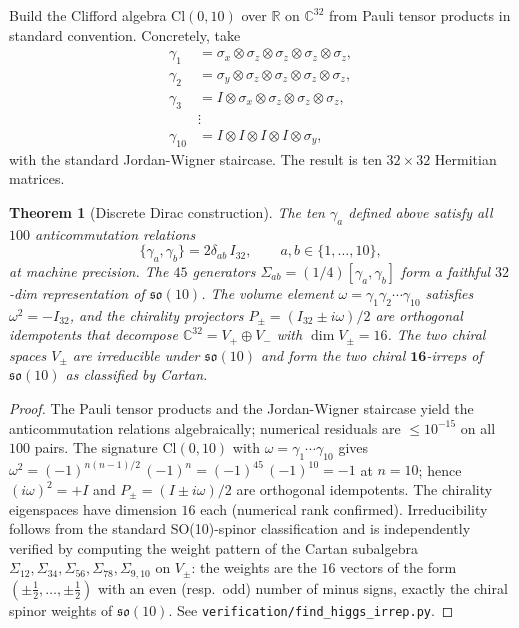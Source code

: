 \documentclass[11pt,reqno]{amsart}
\newtheorem{theorem}{Theorem}[section]
\theoremstyle{definition}
\newcommand{\C}{\mathbb{C}}
\newcommand{\R}{\mathbb{R}}
\newcommand{\so}{\mathfrak{so}}
\newcommand{\Cl}{\mathrm{Cl}}
\begin{document}
Build the Clifford algebra $\Cl(0, 10)$ over $\R$ on $\C^{32}$ from
Pauli tensor products in standard convention. Concretely, take
\begin{align*}
  \gamma_1 &= \sigma_x \otimes \sigma_z \otimes \sigma_z \otimes
              \sigma_z \otimes \sigma_z, \\
  \gamma_2 &= \sigma_y \otimes \sigma_z \otimes \sigma_z \otimes
              \sigma_z \otimes \sigma_z, \\
  \gamma_3 &= I \otimes \sigma_x \otimes \sigma_z \otimes \sigma_z
              \otimes \sigma_z, \\
  &\vdots \\
  \gamma_{10} &= I \otimes I \otimes I \otimes I \otimes \sigma_y,
\end{align*}
with the standard Jordan-Wigner staircase. The result is ten
$32 \times 32$ Hermitian matrices.

\begin{theorem}[Discrete Dirac construction]
\label{thm:cl-construction}
The ten $\gamma_a$ defined above satisfy all $100$ anticommutation
relations
\[
  \{\gamma_a, \gamma_b\} = 2 \delta_{ab}\, I_{32}, \qquad a, b \in
  \{1, \ldots, 10\},
\]
at machine precision. The $45$ generators $\Sigma_{ab} =
(1/4)[\gamma_a, \gamma_b]$ form a faithful $32$-dim representation
of $\so(10)$. The volume element $\omega = \gamma_1 \gamma_2
\cdots \gamma_{10}$ satisfies $\omega^2 = -I_{32}$, and the
chirality projectors $P_\pm = (I_{32} \pm i\omega)/2$ are orthogonal
idempotents that decompose $\C^{32} = V_+ \oplus V_-$ with
$\dim V_\pm = 16$. The two chiral spaces $V_\pm$ are irreducible
under $\so(10)$ and form the two chiral $\mathbf{16}$-irreps of
$\so(10)$ as classified by Cartan.
\end{theorem}

\begin{proof}
The Pauli tensor products and the Jordan-Wigner staircase yield the
anticommutation relations algebraically; numerical residuals are
$\le 10^{-15}$ on all $100$ pairs. The signature $\Cl(0, 10)$ with
$\omega = \gamma_1 \cdots \gamma_{10}$ gives $\omega^2 =
(-1)^{n(n-1)/2}\,(-1)^n = (-1)^{45}\,(-1)^{10} = -1$ at $n = 10$;
hence $(i\omega)^2 = +I$ and $P_\pm = (I \pm i\omega)/2$ are
orthogonal idempotents. The chirality eigenspaces have dimension
$16$ each (numerical rank confirmed). Irreducibility follows from
the standard SO(10)-spinor classification and is independently
verified by computing the weight pattern of the Cartan subalgebra
$\Sigma_{12}, \Sigma_{34}, \Sigma_{56}, \Sigma_{78}, \Sigma_{9,10}$
on $V_\pm$: the weights are the $16$ vectors of the form
$(\pm \tfrac{1}{2}, \ldots, \pm \tfrac{1}{2})$ with an even (resp.\
odd) number of minus signs, exactly the chiral spinor weights of
$\so(10)$. See \texttt{verification/find\_higgs\_irrep.py}.
\end{proof}
\end{document}
